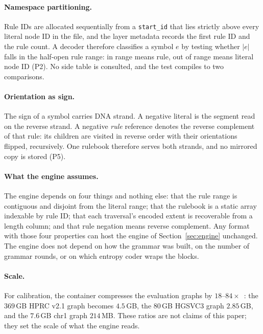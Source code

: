 \paragraph{Namespace partitioning.}
Rule IDs are allocated sequentially from a \texttt{start\_id} that lies strictly
above every literal node ID in the file, and the layer metadata records the first
rule ID and the rule count. A decoder therefore classifies a symbol $e$ by testing
whether $|e|$ falls in the half-open rule range: in range means rule, out of range
means literal node ID (P2). No side table is consulted, and the test compiles to
two comparisons.

\paragraph{Orientation as sign.}
The sign of a symbol carries DNA strand. A negative literal is the segment read on
the reverse strand. A negative \emph{rule} reference denotes the reverse complement
of that rule: its children are visited in reverse order with their orientations
flipped, recursively. One rulebook therefore serves both strands, and no mirrored
copy is stored (P5).

\paragraph{What the engine assumes.}
The engine depends on four things and nothing else: that the rule range is
contiguous and disjoint from the literal range; that the rulebook is a static
array indexable by rule ID; that each traversal's encoded extent is recoverable
from a length column; and that rule negation means reverse complement. Any format
with those four properties can host the engine of Section~\ref{sec:engine}
unchanged. The engine does not depend on how the grammar was built, on the number
of grammar rounds, or on which entropy coder wraps the blocks.

\paragraph{Scale.}
For calibration, the container compresses the evaluation graphs by
$18$--$84\times$~\cite{gfaz2026}: the $369$\,GB HPRC v2.1 graph becomes
$4.5$\,GB, the $80$\,GB HGSVC3 graph $2.85$\,GB, and the $7.6$\,GB chr1 graph
$214$\,MB. These ratios are not claims of this paper; they set the scale of what
the engine reads.

